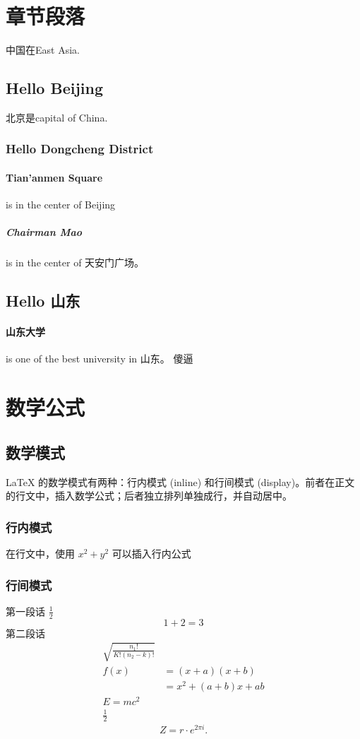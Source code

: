 \documentclass[UTF8]{article}
\begin{document}
\section{章节段落}
 中国在East Asia.
 \subsection{Hello Beijing}
     北京是capital of China.
     \subsubsection{Hello Dongcheng District}
         \paragraph{Tian'anmen Square}
             is in the center of Beijing
             \subparagraph{Chairman Mao}
                 is in the center of 天安门广场。
 \subsection{Hello 山东}
     \paragraph{山东大学} is one of the best university in 山东。
         傻逼
\section{数学公式}
 \subsection{数学模式}
     LaTeX 的数学模式有两种：行内模式 (inline) 和行间模式 (display)。前者在正文的行文中，插入数学公式；后者独立排列单独成行，并自动居中。
     \subsubsection{行内模式}
         在行文中，使用 $ x^2+y^2 $ 可以插入行内公式
     \subsubsection{行间模式}
         第一段话 $ \frac{1}{2} $
         \[1+2=3\]
         第二段话
         \begin{align}
             \sqrt{\frac{n_1!}{K!(n_2-k)!}} \\
             f(x) & = (x+a)(x+b)            \\
                  & = x^2 + (a+b)x + ab     \\
             E=mc^2                         \\
             \frac{1}{2}
         \end{align}
         \[Z=r\cdot e^{2\pi i}.\]
\end{document}

